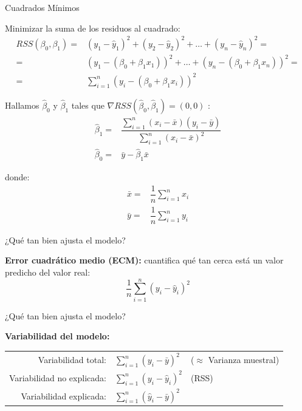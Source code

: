 \documentclass[aspectratio=169, usenames,dvipsnames]{beamer}
\begin{document}
\begin{frame}
    \Large
    Cuadrados Mínimos
    \vspace{1em}

    \pause
    \normalsize
    Minimizar la suma de los residuos al cuadrado:
    \[
    \begin{array}{rl}
       RSS(\beta_0, \beta_1) =  & (y_1-\hat{y}_1)^2 + (y_2-\hat{y}_2)^2 + \dots + (y_n-\hat{y}_n)^2 = \\
         = & (y_1 - (\beta_0+\beta_1x_1))^2 + \dots + (y_n - (\beta_0+\beta_1x_n))^2 = \\
         = & \displaystyle\sum_{i=1}^n (y_i - (\beta_0+\beta_1x_i))^2
         
    \end{array}
    \]
\end{frame}

\begin{frame}
     Hallamos $\hat{\beta}_0$ y $\hat{\beta}_1$ tales que $\nabla RSS (\hat{\beta}_0, \hat{\beta}_1) = (0, 0)$ :
     \[
     \begin{array}{rl}
          \hat{\beta}_1 = & \dfrac{\displaystyle\sum_{i=1}^n(x_i - \bar{x})(y_i - \bar{y})}{\displaystyle\sum_{i=1}^n(x_i - \bar{x})^2}  \\[1em]
          \hat{\beta}_0 = & \bar{y} - \hat{\beta}_1\bar{x}
     \end{array}
     \]

     donde:
     \[
     \begin{array}{rl}
          \bar{x} =& \dfrac{1}{n} \displaystyle\sum_{i=1}^n x_i  \\
          \bar{y} =& \dfrac{1}{n} \displaystyle\sum_{i=1}^n y_i
     \end{array}
     \]
\end{frame}

\begin{frame}
    \Large
    ¿Qué tan bien ajusta el modelo?
    \vspace{1em}

    \normalsize
    \textbf{Error cuadrático medio (ECM):} cuantifica qué tan cerca está un valor predicho del valor real:
    \[\dfrac{1}{n}\sum_{i=1}^n (y_i - \hat{y}_i)^2\]
\end{frame}

\begin{frame}
    \Large
    ¿Qué tan bien ajusta el modelo?
    \vspace{1em}

    \normalsize
    \textbf{Variabilidad del modelo:} 
    \begin{center}
    \begin{tabular}{rll}
        Variabilidad total: & $\sum_{i=1}^n (y_i - \bar{y})^2$ & {\color{black!50!white}($\approx$ Varianza muestral)}\\
        Variabilidad no explicada: & $\sum_{i=1}^n (y_i - \hat{y}_i)^2$ & {\color{black!50!white} (RSS)}\\
        Variabilidad explicada: & $\sum_{i=1}^n (\hat{y}_i - \bar{y})^2$ &
    \end{tabular}
    \end{center} 
    
\end{frame}
\end{document}
